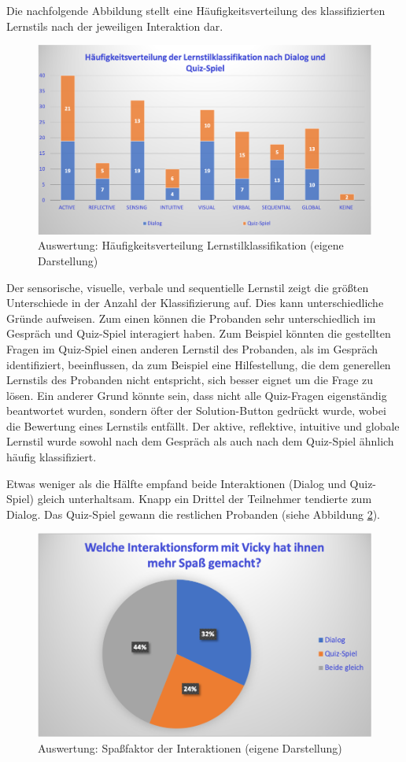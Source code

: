Die nachfolgende Abbildung stellt eine Häufigkeitsverteilung des klassifizierten Lernstils nach der jeweiligen Interaktion dar.
\begin{figure}[H]
    \centering
    \includegraphics[width=0.65\linewidth]{images/Auswertung/A3.6.png}
   \caption[Auswertung: Häufigkeitsverteilung Lernstilklassifikation] {Auswertung: Häufigkeitsverteilung Lernstilklassifikation (eigene Darstellung)}
  \label{fig:Verteilung_Lernstilklassifikation}
  \end{figure} 

Der sensorische, visuelle, verbale und sequentielle Lernstil zeigt die größten Unterschiede in 
der Anzahl der Klassifizierung auf. 
Dies kann unterschiedliche Gründe aufweisen. Zum einen können die Probanden sehr unterschiedlich im Gespräch und Quiz-Spiel 
interagiert haben. Zum Beispiel könnten die gestellten Fragen im Quiz-Spiel einen anderen Lernstil des Probanden, als im Gespräch identifiziert,
beeinflussen, da zum Beispiel eine Hilfestellung, die dem generellen Lernstils des Probanden nicht entspricht, sich besser eignet um die Frage zu lösen.
 Ein anderer Grund könnte sein, dass nicht alle Quiz-Fragen eigenständig beantwortet wurden, sondern öfter der 
\glqq Solution-Button\grqq{} gedrückt wurde, wobei die Bewertung eines Lernstils entfällt. 
Der aktive, reflektive, intuitive und globale Lernstil wurde sowohl nach dem Gespräch als auch 
nach dem Quiz-Spiel ähnlich häufig klassifiziert.

Etwas weniger als die Hälfte empfand beide Interaktionen (Dialog und Quiz-Spiel) gleich unterhaltsam. 
Knapp ein Drittel der Teilnehmer tendierte zum Dialog. Das Quiz-Spiel gewann die restlichen Probanden (siehe Abbildung \ref{fig:Interaktion_Spaßfaktor}).
\begin{figure}[H]
    \centering
    \includegraphics[width=0.6\linewidth]{images/Auswertung/A3.5.png}
   \caption[Auswertung: Spaßfaktor der Interaktionen] {Auswertung: Spaßfaktor der Interaktionen (eigene Darstellung)}
  \label{fig:Interaktion_Spaßfaktor}
  \end{figure} 



